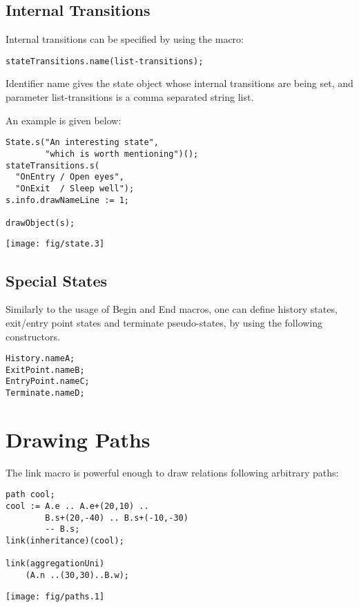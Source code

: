 \documentclass{article}
\newcommand{\code}{\ttfamily}
\begin{document}
\subsection{Internal Transitions}

Internal transitions can be specified by using the macro:
\begin{verbatim}
stateTransitions.name(list-transitions);
\end{verbatim}

Identifier {\code name} gives the state object whose internal transitions are being set,
and parameter {\code list-transitions} is a comma separated string list.


An example is given below:

\begin{multicols}{2}
\begin{verbatim}
State.s("An interesting state",
        "which is worth mentioning")();
stateTransitions.s(
  "OnEntry / Open eyes",
  "OnExit  / Sleep well");
s.info.drawNameLine := 1;

drawObject(s);
\end{verbatim}
\columnbreak
\hspace{1cm}\texttt{[image: fig/state.3]}
\end{multicols}

\subsection{Special States}

Similarly to the usage of {\code Begin} and {\code End} macros, one can define history states,
exit/entry point states and terminate pseudo-states, by using the following constructors.

\begin{verbatim}
History.nameA;
ExitPoint.nameB;
EntryPoint.nameC;
Terminate.nameD;
\end{verbatim}

\section{Drawing Paths}

The {\code link} macro is powerful enough to draw relations following arbitrary paths:

\begin{multicols}{2}
\begin{verbatim}
path cool;
cool := A.e .. A.e+(20,10) ..
        B.s+(20,-40) .. B.s+(-10,-30)
        -- B.s;
link(inheritance)(cool);

link(aggregationUni)
    (A.n ..(30,30)..B.w);
\end{verbatim}
\columnbreak
\hspace{1cm}\texttt{[image: fig/paths.1]}
\end{multicols}
\end{document}

